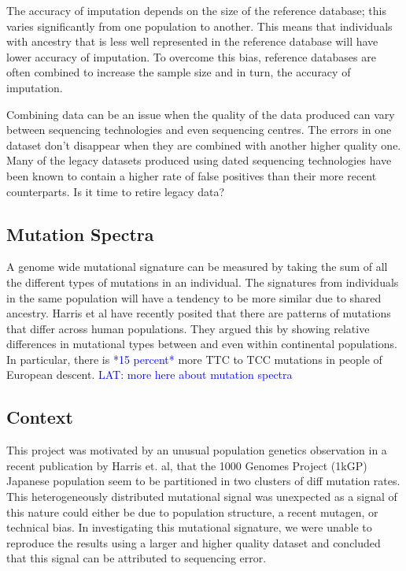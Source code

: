 \documentclass[12pt,twocolumn]{article}
\newcommand{\lat}[1]{\textcolor{blue}{LAT: #1}}
\newcommand{\todo}[1]{\textcolor{blue}{*#1*}}
\begin{document}
The accuracy of imputation depends on the size of the reference database; this varies significantly from one population to another.
This means that individuals with ancestry that is less well represented in the reference database will have lower accuracy of imputation.
To overcome this bias, reference databases are often combined to increase the sample size and in turn, the accuracy of imputation.


Combining data can be an issue when the quality of the data produced can vary between sequencing technologies and even sequencing centres.
The errors in one dataset don't disappear when they are combined with another higher quality one. 
Many of the legacy datasets produced using dated sequencing technologies have been known to contain a higher rate of false positives than their more recent counterparts.
Is it time to retire legacy data? 

	\subsection{Mutation Spectra} 
A genome wide mutational signature can be measured by taking the sum of all the different types of mutations in an individual. 
The signatures from individuals in the same population will have a tendency to be more similar due to shared ancestry.
Harris et al have recently posited that there are patterns of mutations that differ across human populations.
They argued this by showing relative differences in mutational types between and even within continental populations.
In particular, there is \todo{15 percent} more TTC to TCC mutations in people of European descent.
\lat{more here about mutation spectra}

	\subsection{Context}
This project was motivated by an unusual population genetics observation in a recent publication by Harris et. al, that the 1000 Genomes Project (1kGP) Japanese population seem to be partitioned in two clusters of diff mutation rates. 
This heterogeneously distributed mutational signal was unexpected as a signal of this nature could either be due to population structure, a recent mutagen, or technical bias.
In investigating this mutational signature, we were unable to reproduce the results using a larger and higher quality dataset and concluded that this signal can be attributed to sequencing error.
\end{document}
